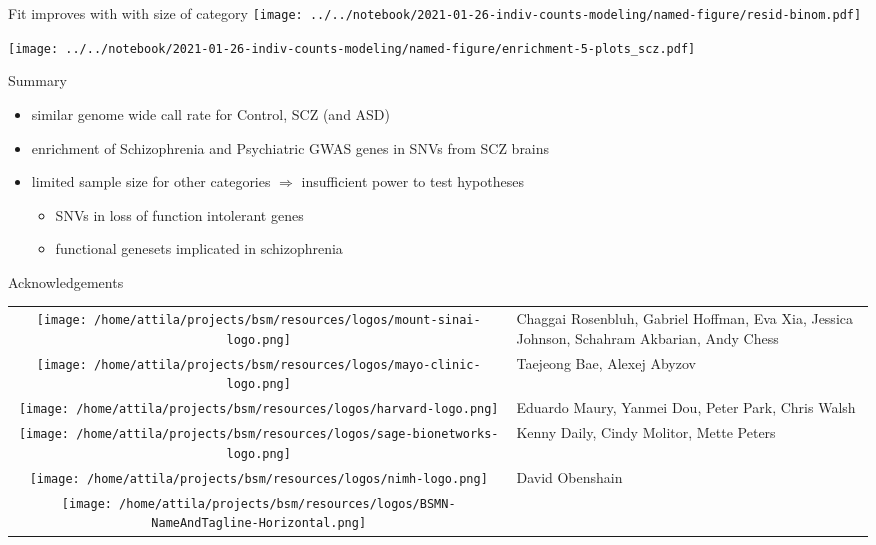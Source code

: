 \documentclass[usenames,dvipsnames]{beamer}
\begin{document}
\begin{frame}{Fit improves with with size of category}
\texttt{[image: ../../notebook/2021-01-26-indiv-counts-modeling/named-figure/resid-binom.pdf]}
\end{frame}

\begin{frame}
\texttt{[image: ../../notebook/2021-01-26-indiv-counts-modeling/named-figure/enrichment-5-plots\_scz.pdf]}
\end{frame}

\begin{frame}{Summary}
\begin{itemize}
\item similar genome wide call rate for Control, SCZ (and ASD)
\item enrichment of Schizophrenia and Psychiatric GWAS genes in SNVs from
	SCZ brains
\item limited sample size for other categories \(\Rightarrow\) insufficient power to test
	hypotheses
\begin{itemize}
	\item SNVs in loss of function intolerant genes
        \item functional genesets implicated in schizophrenia
\end{itemize}
\end{itemize}
\end{frame}

\begin{frame}{Acknowledgements}
\footnotesize
\begin{tabular}{cp{3in}}
\parbox[c]{9em}{\texttt{[image: /home/attila/projects/bsm/resources/logos/mount-sinai-logo.png]}}
& Chaggai Rosenbluh, Gabriel Hoffman, Eva Xia, Jessica Johnson, Schahram Akbarian, Andy Chess \\
\noalign{\medskip}
\parbox[c]{9em}{\texttt{[image: /home/attila/projects/bsm/resources/logos/mayo-clinic-logo.png]}} & Taejeong Bae, Alexej Abyzov \\
\noalign{\medskip}
\parbox[c]{9em}{\texttt{[image: /home/attila/projects/bsm/resources/logos/harvard-logo.png]}}
& Eduardo Maury, Yanmei Dou, Peter Park, Chris Walsh \\
\noalign{\medskip}
\parbox[c]{9em}{\texttt{[image: /home/attila/projects/bsm/resources/logos/sage-bionetworks-logo.png]}} & Kenny Daily, Cindy Molitor, Mette Peters \\
\noalign{\medskip}
\parbox[c]{9em}{\texttt{[image: /home/attila/projects/bsm/resources/logos/nimh-logo.png]}}
& David Obenshain \\
\noalign{\medskip}
\parbox[c]{9em}{\texttt{[image: /home/attila/projects/bsm/resources/logos/BSMN-NameAndTagline-Horizontal.png]}}
& \\
\end{tabular}
\end{frame}
\end{document}
